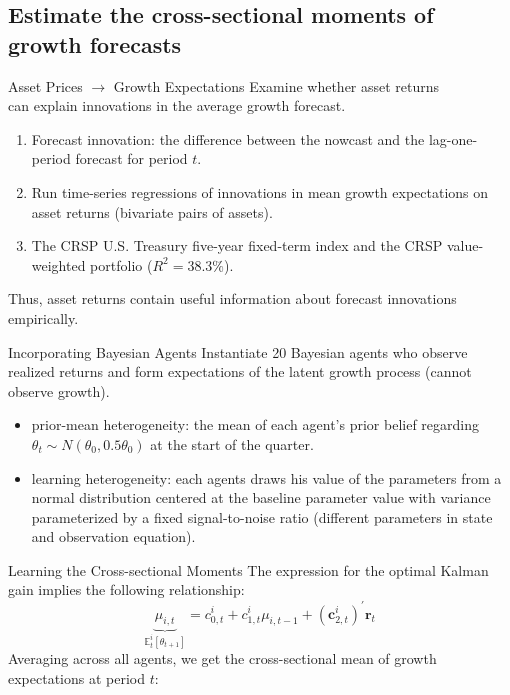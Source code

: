 \documentclass[UTF8, 16pt]{beamer}
\begin{document}
\begin{CJK*}{UTF8}{gbsn}
\subsection{Estimate the cross-sectional moments of growth forecasts}
\begin{frame}{Asset Prices $\rightarrow$ Growth Expectations}
	Examine whether \alert{asset returns} \\ can explain \alert{innovations in the average growth forecast}.
	\begin{enumerate}
		\item Forecast innovation: the difference between the \alert{nowcast} and the \alert{lag-one-period forecast} for period $t$.
		\item Run time-series regressions of \alert{innovations in mean growth expectations} on \alert{asset returns} (bivariate pairs of assets).
		\item The CRSP U.S. Treasury five-year fixed-term index and the CRSP value-weighted portfolio ($R^2=38.3\%$).
	\end{enumerate}
	Thus, \alert{asset returns} contain useful information about \alert{forecast innovations} empirically.
\end{frame}
\begin{frame}{Incorporating Bayesian Agents}
	Instantiate 20 \alert{Bayesian agents} who observe realized returns and form expectations of the latent growth process (cannot observe growth).
	\begin{itemize}
		\item \alert{prior-mean heterogeneity}: the mean of each agent’s \alert{prior belief} regarding $\theta_t\sim N(\theta_0, 0.5\theta_0)$ at the start of the quarter.
		\item \alert{learning heterogeneity}: each agents draws his value of the parameters from a normal distribution centered at the baseline parameter value with variance parameterized by a fixed signal-to-noise ratio (\alert{different parameters in state and observation equation}).
	\end{itemize}
\end{frame}
\begin{frame}{Learning the Cross-sectional Moments}
	The expression for the optimal Kalman gain implies the following relationship:
	$$\underbrace{\mu_{i, t}}_{\mathbb{E}_{t}^{i}\left[\theta_{t+1}\right]}=c_{0, t}^{i}+c_{1, t}^{i} \mu_{i, t-1}+\left(\mathbf{c}_{2, t}^{i}\right)^{\prime} \mathbf{r}_{t}$$
	Averaging across all agents, we get the cross-sectional mean of growth expectations at period $t$:

\end{frame}
\end{CJK*}
\end{document}
